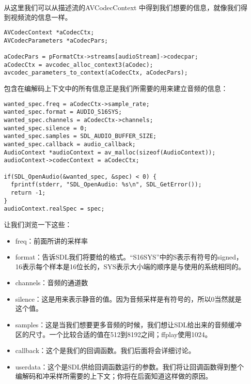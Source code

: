 从这里我们可以从描述流的AVCodecContext 中得到我们想要的信息，就像我们得到视频流的信息一样。

\begin{lstlisting}
AVCodecContext *aCodecCtx;
AVCodecParameters *aCodecPars;

aCodecPars = pFormatCtx->streams[audioStream]->codecpar;
aCodecCtx = avcodec_alloc_context3(aCodec);
avcodec_parameters_to_context(aCodecCtx, aCodecPars);
\end{lstlisting}

包含在编解码上下文中的所有信息正是我们所需要的用来建立音频的信息：

\begin{lstlisting}
wanted_spec.freq = aCodecCtx->sample_rate;
wanted_spec.format = AUDIO_S16SYS;
wanted_spec.channels = aCodecCtx->channels;
wanted_spec.silence = 0;
wanted_spec.samples = SDL_AUDIO_BUFFER_SIZE;
wanted_spec.callback = audio_callback;
AudioContext *audioContext = av_malloc(sizeof(AudioContext));
audioContext->codecContext = aCodecCtx;

if(SDL_OpenAudio(&wanted_spec, &spec) < 0) {
  fprintf(stderr, "SDL_OpenAudio: %s\n", SDL_GetError());
  return -1;
}
audioContext.realSpec = spec;
\end{lstlisting}

让我们浏览一下这些：
\begin{itemize}
  \item freq：前面所讲的采样率

  \item format：告诉SDL我们将要给的格式。“S16SYS”中的S表示有符号的signed，16表示每个样本是16位长的，SYS表示大小端的顺序是与使用的系统相同的。

  \item channels：音频的通道数

  \item silence：这是用来表示静音的值。因为音频采样是有符号的，所以0当然就是这个值。

  \item samples：这是当我们想要更多音频的时候，我们想让SDL给出来的音频缓冲区的尺寸。一个比较合适的值在512到8192之间；ffplay使用1024。

  \item callback：这个是我们的回调函数。我们后面将会详细讨论。

  \item userdata：这个是SDL供给回调函数运行的参数。我们将让回调函数得到整个编解码和冲采样所需要的上下文；你将在后面知道这样做的原因。

\end{itemize}

